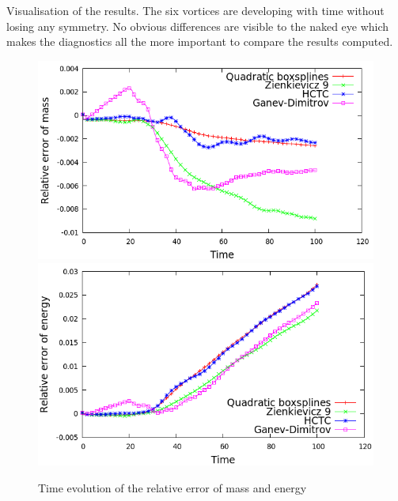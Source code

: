 \documentclass[proc]{edpsmath}
\begin{document}
Visualisation of the results. The six vortices are developing with time without losing any symmetry. No obvious differences are visible to the naked eye which makes the diagnostics all the more important to compare the results computed.


\begin{figure}[h!]
	\includegraphics[scale=0.3]{figures/mass_cg.png}
	\includegraphics[scale=0.3]{figures/energy_cg.png}
	\caption{Time evolution of the relative error of mass and energy}
\end{figure}
\end{document}

